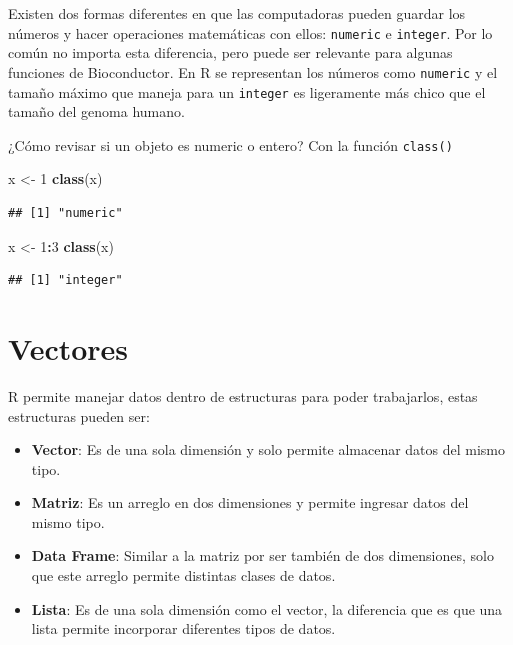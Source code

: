 \documentclass[
]{book}
\newenvironment{Shaded}{\begin{snugshade}}{\end{snugshade}}
\newcommand{\DecValTok}[1]{\textcolor[rgb]{0.00,0.00,0.81}{#1}}
\newcommand{\FunctionTok}[1]{\textcolor[rgb]{0.13,0.29,0.53}{\textbf{#1}}}
\newcommand{\NormalTok}[1]{#1}
\newcommand{\OtherTok}[1]{\textcolor[rgb]{0.56,0.35,0.01}{#1}}
\newcommand{\SpecialCharTok}[1]{\textcolor[rgb]{0.81,0.36,0.00}{\textbf{#1}}}
\providecommand{\tightlist}{%
  \setlength{\itemsep}{0pt}\setlength{\parskip}{0pt}}
\begin{document}
Existen dos formas diferentes en que las computadoras pueden guardar los números y hacer operaciones matemáticas con ellos: \texttt{numeric} e \texttt{integer}.
Por lo común no importa esta diferencia, pero puede ser relevante para algunas funciones de Bioconductor. En R se representan los números como \texttt{numeric} y el tamaño máximo que maneja para un \texttt{integer} es ligeramente más chico que el tamaño del genoma humano.

¿Cómo revisar si un objeto es numeric o entero? Con la función \texttt{class()}

\begin{Shaded}
\begin{Highlighting}[]
\NormalTok{x }\OtherTok{\textless{}{-}} \DecValTok{1}
\FunctionTok{class}\NormalTok{(x)}
\end{Highlighting}
\end{Shaded}

\begin{verbatim}
## [1] "numeric"
\end{verbatim}

\begin{Shaded}
\begin{Highlighting}[]
\NormalTok{x }\OtherTok{\textless{}{-}} \DecValTok{1}\SpecialCharTok{:}\DecValTok{3}
\FunctionTok{class}\NormalTok{(x)}
\end{Highlighting}
\end{Shaded}

\begin{verbatim}
## [1] "integer"
\end{verbatim}

\chapter{Vectores}\label{estructura}

R permite manejar datos dentro de estructuras para poder trabajarlos, estas estructuras pueden ser:

\begin{itemize}
\tightlist
\item
  \textbf{Vector}: Es de una sola dimensión y solo permite almacenar datos del mismo tipo.
\item
  \textbf{Matriz}: Es un arreglo en dos dimensiones y permite ingresar datos del mismo tipo.
\item
  \textbf{Data Frame}: Similar a la matriz por ser también de dos dimensiones, solo que este arreglo permite distintas clases de datos.
\item
  \textbf{Lista}: Es de una sola dimensión como el vector, la diferencia que es que una lista permite incorporar diferentes tipos de datos.
\end{itemize}
\end{document}
